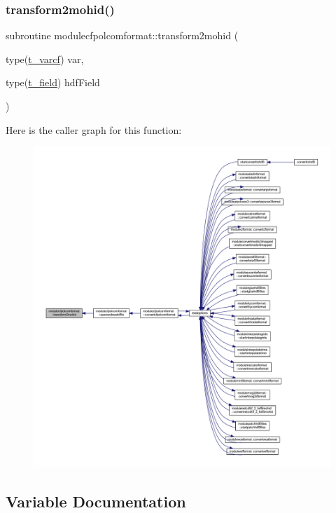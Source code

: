 \subsubsection{\texorpdfstring{transform2mohid()}{transform2mohid()}}
{\footnotesize\ttfamily subroutine modulecfpolcomformat\+::transform2mohid (\begin{DoxyParamCaption}\item[{type(\mbox{\hyperlink{structncdflib_1_1t__varcf}{t\+\_\+varcf}})}]{var,  }\item[{type(\mbox{\hyperlink{structmodulecfpolcomformat_1_1t__field}{t\+\_\+field}})}]{hdf\+Field }\end{DoxyParamCaption})\hspace{0.3cm}{\ttfamily [private]}}

Here is the caller graph for this function\+:\nopagebreak
\begin{figure}[H]
\begin{center}
\leavevmode
\includegraphics[width=350pt]{namespacemodulecfpolcomformat_a3d0d3ed8a29201140d8429b140242edc_icgraph}
\end{center}
\end{figure}


\subsection{Variable Documentation}
\mbox{\label{namespacemodulecfpolcomformat_a2b38a369c5d65b6539825294901a7f82}} 
